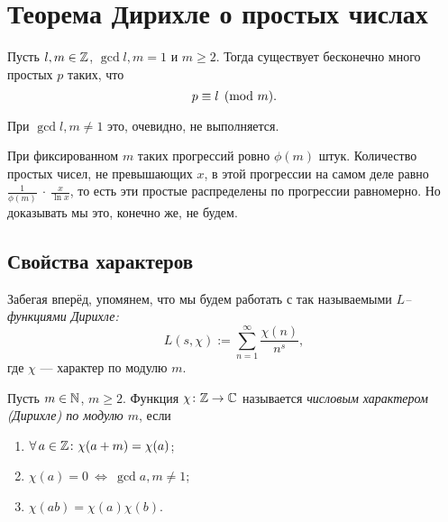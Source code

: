 \section{Теорема Дирихле о простых числах}
\label{sec:II_Dirichlet-theorem}


\begin{ntheorem}
\label{thm:II-1}
    Пусть $l,m \in \mathbb{Z}$, $\gcd{l, m} = 1$ и $m \ge 2$. Тогда существует бесконечно много простых $p$ таких, что 
    \[
        p \equiv l \pmod m.
    \]
\end{ntheorem}

\begin{remark}
    При $\gcd{l, m} \ne 1$ это, очевидно, не выполняется.
\end{remark}

\begin{remark}
    При фиксированном $m$ таких прогрессий ровно $\phi(m)$ штук. Количество простых чисел, не превышающих $x$, в этой прогрессии на самом деле равно $\frac{1}{\phi(m)}~\cdot~\frac{x}{\ln{x}}$, то есть эти простые распределены по прогрессии равномерно. Но доказывать мы это, конечно же, не будем.
\end{remark}


\subsection{Свойства характеров}
\label{subsec:II-1}

\begin{remark}
    Забегая вперёд, упомянем, что мы будем работать с так называемыми \emph{$L$--функциями Дирихле:}
    \[
        L(s, \chi) := \sum_{n=1}^{\infty} \frac{\chi(n)}{n^s},
    \]
    где $\chi$ --- характер по модулю $m$.
\end{remark}

\begin{ndefinition}
\label{def:II_Dirichlet-character}
    Пусть $m \in \mathbb{N}$, $m \ge 2$. Функция $\chi\colon \mathbb{Z} \to \mathbb{C}$ называется \emph{числовым характером (Дирихле) по модулю $m$}, если
    \begin{enumerate}
        \item 
            $\forall a \in \ZZ\colon \chi(a+m) = \chi(a)$;
        \item 
            $\chi(a) = 0 \ \Leftrightarrow \ \gcd{a, m} \ne 1$;
        \item 
            $\chi(ab) = \chi(a)\chi(b)$.
    \end{enumerate}
\end{ndefinition}

